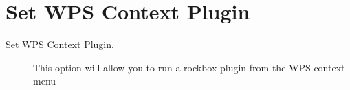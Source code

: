 \section{\label{ref:SetWPSContextPlugin}Set WPS Context Plugin}

  \begin{description}
  \item[Set WPS Context Plugin.]
  This option will allow you to run a rockbox plugin from the WPS context menu
   \end{description}
